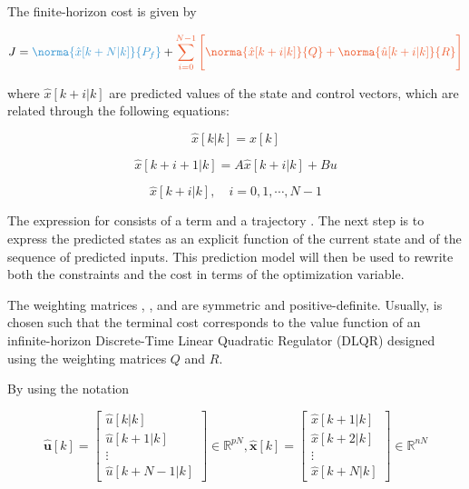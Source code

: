 The finite-horizon cost is given by


\begin{equation}
    J = \blue{\norma{\hat{x}[k + N | k]}{P_f}} + \orange{\sum^{N-1}_{i=0} \Bigg[ \norma{\hat{x}[k + i | k]}{Q} + \norma{\hat{u}[k + i | k]}{R} \Bigg]}
\end{equation}

\noindent
where $\hat{x}[k+i|k]$ are predicted values of the state and control vectors, which are 
related through the following equations:

\noindent
\begin{equation}
    \hat{x}[k|k] = x[k]
\end{equation}

\noindent
\begin{equation}
    \hat{x}[k + i + 1|k] = A \hat{x}[k+i|k] + Bu
\end{equation}

\noindent
\begin{equation}
    \hat{x}[k + i|k], \quad i =  0, 1, \dotsm, N-1
\end{equation}


The expression for  consists of a  term and a trajectory 
. The next step is to express the predicted states as an explicit function of the current state and of the sequence of predicted inputs. This prediction model will then be used to rewrite both the constraints and the cost in terms of the optimization variable.

The weighting matrices , , and  are symmetric and 
positive-definite. Usually,  is chosen such that the terminal cost 
 corresponds to the value function of an infinite-horizon 
Discrete-Time Linear Quadratic Regulator (DLQR) designed using the weighting matrices $Q$ and $R$.

By using the notation

\begin{equation}
    \mathbf{\hat{u}}[k] = 
    \left[
        \begin{matrix}
            \hat{u}[k | k] \\		
            \hat{u}[k + 1 | k] \\		
            \vdots \\
            \hat{u}[k + N-1 | k]
        \end{matrix}
    \right]
    \in \mathbb{R}^{pN},
    \mathbf{\hat{x}}[k] = 
    \left[
        \begin{matrix}
            \hat{x}[k + 1| k] \\ 
            \hat{x}[k + 2| k] \\ 
            \vdots \\
            \hat{x}[k + N | k]
        \end{matrix}
    \right]
    \in \mathbb{R}^{nN}
\end{equation}

